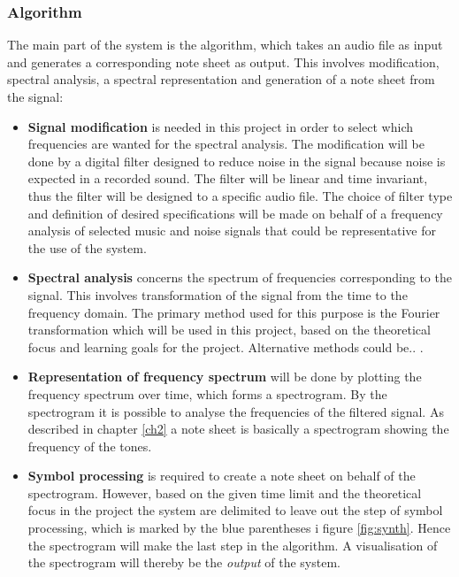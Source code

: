 \subsubsection{Algorithm}
The main part of the system is the algorithm, which takes an audio file as input and generates a corresponding note sheet as output. This involves modification, spectral analysis, a spectral representation and generation of a note sheet from the signal:
\begin{itemize}
\item[] \textbf{Signal modification} is needed in this project in order to select which frequencies are wanted for the spectral analysis. The modification will be done by a digital filter designed to reduce noise in the signal because noise is expected in a recorded sound. The filter will be linear and time invariant, thus the filter will be designed to a specific audio file. The choice of filter type and definition of desired specifications will be made on behalf of a frequency analysis of selected music and noise signals that could be representative for the use of the system.             
\item[] \textbf{Spectral analysis} concerns the spectrum of frequencies corresponding to the signal. This involves transformation of the signal from the time to the frequency domain.     
The primary method used for this purpose is the Fourier transformation which will be used in this project, based on the theoretical focus and learning goals for the project. Alternative methods could be.. .
\item[] \textbf{Representation of frequency spectrum} will be done by plotting the frequency spectrum over time, which forms a spectrogram. By the spectrogram it is possible to analyse the frequencies of the filtered signal. As described in chapter \ref{ch2} a note sheet is basically a spectrogram showing the frequency of the tones.
\item[] \textbf{Symbol processing} is required to create a note sheet on behalf of the spectrogram. 
However, based on the given time limit and the theoretical focus in the project the system are delimited to leave out the step of symbol processing, which is marked by the blue parentheses i figure \ref{fig:synth}. Hence the spectrogram will make the last step in the algorithm.
A visualisation of the spectrogram will thereby be the \textit{output} of the system.   
\end{itemize}

